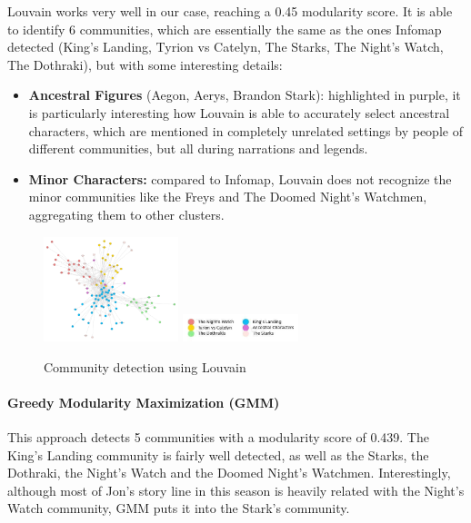 \documentclass[10pt,twocolumn,letterpaper]{article}
\begin{document}
Louvain works very well in our case, reaching a 0.45 modularity score. It is able to identify 6 communities, which are essentially the same as the ones Infomap detected (King's Landing, Tyrion vs Catelyn, The Starks, The Night's Watch, The Dothraki), but with some interesting details:

\begin{itemize}
    \item \textbf{Ancestral Figures} (Aegon, Aerys, Brandon Stark): highlighted in purple, it is particularly interesting how Louvain is able to accurately select ancestral characters, which are mentioned in completely unrelated settings by people of different communities, but all during narrations and legends.
    \item \textbf{Minor Characters:} compared to Infomap, Louvain does not recognize the minor communities like the Freys and The Doomed Night's Watchmen, aggregating them to other clusters.
\end{itemize}

\begin{figure}[!h] 
    \centering
    \includegraphics[width=0.35\textwidth]{img/s1/communities_louvain.jpg}
    \includegraphics[width=0.3\textwidth]{img/s1/louvain_legend.jpg} \\
    \vspace{0.2cm}
    \label{fig:louvain_s1}
    \caption{\small{Community detection using Louvain}}
\end{figure}

\paragraph{Greedy Modularity Maximization (GMM)}

This approach detects 5 communities with a modularity score of 0.439.
The King's Landing community is fairly well detected, as well as the Starks, the Dothraki, the Night's Watch and the Doomed Night's Watchmen. Interestingly, although most of Jon's story line in this season is heavily related with the Night's Watch community, GMM puts it into the Stark's community. 
\end{document}
